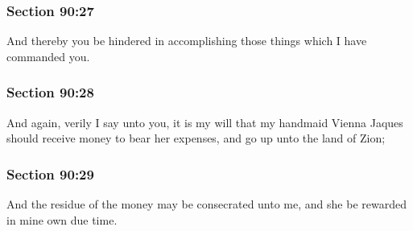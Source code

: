 	\subsubsection{Section 90:27} %
		\label{DC90-27}

		And thereby you be hindered in accomplishing those things which I have commanded you.


	\subsubsection{Section 90:28} %
		\label{DC90-28}

		And again, verily I say unto you, it is my will that my handmaid Vienna Jaques should receive money to bear her expenses, and go up unto the land of Zion;


	\subsubsection{Section 90:29} %
		\label{DC90-29}

		And the residue of the money may be consecrated unto me, and she be rewarded in mine own due time.


